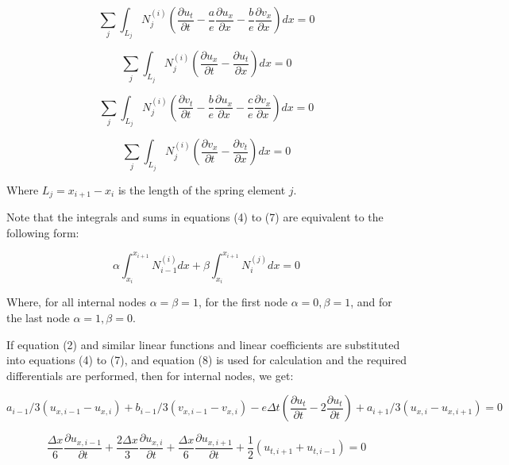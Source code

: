 \documentclass{mcmthesis}  %
\begin{document}
\begin{appendices}
\begin{equation}
\sum_j \int_{L_j} N_j^{(i)} \left(\frac{\partial u_t}{\partial t} - \frac{a}{e}\frac{\partial u_x}{\partial x} - \frac{b}{e}\frac{\partial v_x}{\partial x}\right) dx = 0
\end{equation}

\begin{equation}
\sum_j \int_{L_j} N_j^{(i)} \left(\frac{\partial u_x}{\partial t} - \frac{\partial u_t}{\partial x}\right) dx = 0
\end{equation}

\begin{equation}
\sum_j \int_{L_j} N_j^{(i)} \left(\frac{\partial v_t}{\partial t} - \frac{b}{e}\frac{\partial u_x}{\partial x} - \frac{c}{e}\frac{\partial v_x}{\partial x}\right) dx = 0
\end{equation}

\begin{equation}
\sum_j \int_{L_j} N_j^{(i)} \left(\frac{\partial v_x}{\partial t} - \frac{\partial v_t}{\partial x}\right) dx = 0
\end{equation}

Where $L_j = x_{i+1} - x_i$ is the length of the spring element $j$.

Note that the integrals and sums in equations (4) to (7) are equivalent to the following form:

\begin{equation}
\alpha \int_{x_i}^{x_{i+1}} N_{i-1}^{(i)} dx + \beta \int_{x_i}^{x_{i+1}} N_i^{(j)} dx = 0
\end{equation}

Where, for all internal nodes $\alpha = \beta = 1$, for the first node $\alpha = 0, \beta = 1$, and for the last node $\alpha = 1, \beta = 0$.

If equation (2) and similar linear functions and linear coefficients are substituted into equations (4) to (7), and equation (8) is used for calculation and the required differentials are performed, then for internal nodes, we get:

\begin{equation}
a_{i-1}/3(u_{x,i-1} - u_{x,i}) + b_{i-1}/3(v_{x,i-1} - v_{x,i}) - e\Delta t \left(\frac{\partial u_t}{\partial t} - 2\frac{\partial u_t}{\partial t}\right) + a_{i+1}/3(u_{x,i} - u_{x,i+1}) = 0
\end{equation}

\begin{equation}
\frac{\Delta x}{6} \frac{\partial u_{x,i-1}}{\partial t} + \frac{2\Delta x}{3} \frac{\partial u_{x,i}}{\partial t} + \frac{\Delta x}{6} \frac{\partial u_{x,i+1}}{\partial t} + \frac{1}{2}(u_{t,i+1} + u_{t,i-1}) = 0
\end{equation}


\end{appendices}
\end{document}
